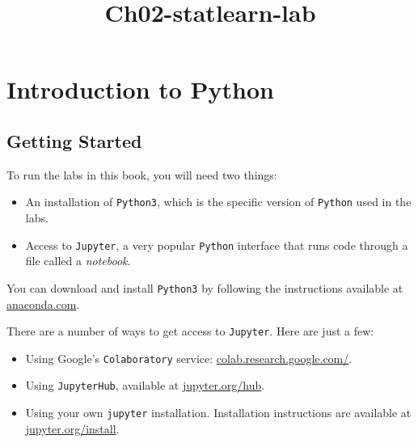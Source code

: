 \documentclass[11pt]{article}
\title{Ch02-statlearn-lab}
\providecommand{\tightlist}{%
      \setlength{\itemsep}{0pt}\setlength{\parskip}{0pt}}
\begin{document}
    
    \maketitle
    
    

    
    \hypertarget{introduction-to-python}{%
\section{Introduction to Python}\label{introduction-to-python}}

\href{https://mybinder.org/v2/gh/intro-stat-learning/ISLP_labs/v2.2?labpath=Ch02-statlearn-lab.ipynb}{}

    \hypertarget{getting-started}{%
\subsection{Getting Started}\label{getting-started}}

    To run the labs in this book, you will need two things:

\begin{itemize}
\tightlist
\item
  An installation of \texttt{Python3}, which is the specific version of
  \texttt{Python} used in the labs.
\item
  Access to \texttt{Jupyter}, a very popular \texttt{Python} interface
  that runs code through a file called a \emph{notebook}.
\end{itemize}

    You can download and install \texttt{Python3} by following the
instructions available at \href{http://anaconda.com}{anaconda.com}.

    There are a number of ways to get access to \texttt{Jupyter}. Here are
just a few:

\begin{itemize}
\tightlist
\item
  Using Google's \texttt{Colaboratory} service:
  \href{https://colab.research.google.com/}{colab.research.google.com/}.
\item
  Using \texttt{JupyterHub}, available at
  \href{https://jupyter.org/hub}{jupyter.org/hub}.
\item
  Using your own \texttt{jupyter} installation. Installation
  instructions are available at
  \href{https://jupyter.org/install}{jupyter.org/install}.
\end{itemize}
\end{document}
